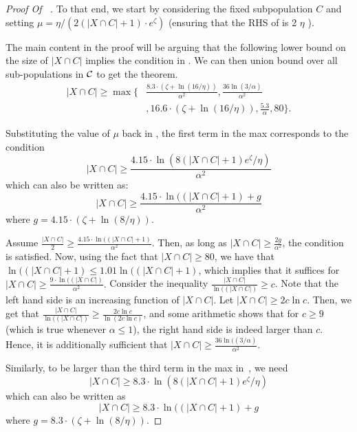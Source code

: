 \begin{proof}[Proof Of ~]
\bigskip\noindent
To that end, we start by considering the fixed subpopulation $C$ and setting $\mu = \eta/\left(2(|X\cap C|+1)\cdot e^{\zeta} \right)$ (ensuring that the RHS of  is 2 $\eta$ ). 

    The main content in the proof will be arguing that the following lower bound on the size of $|X \cap C|$    implies the condition in . We can then union bound over all sub-populations in $\mathcal{C}$ to get the theorem.
    \begin{align}
        |X \cap C| \geq \max\Big\{ & \frac{8.3 \cdot (\zeta + \ln(16/\eta))}{\alpha^2}, \frac{36\ln(3/\alpha)}{\alpha^2} \nonumber \\
        &, 16.6 \cdot (\zeta + \ln(16/\eta)), \frac{5.3}{\alpha}, 80\Big\}.
    \end{align}
 

    
    Substituting the value of $\mu$ back in , the first term in the max corresponds to the condition
    \[
        |X\cap C|\ge \frac{4.15\cdot\ln(8 (|X\cap C|+1) e^{\zeta}/\eta)}{\alpha^2}
    \]
    which can also be written as:
    \[
        |X\cap C|\ge \frac{4.15\cdot\ln((|X\cap C|+1) 
 + g}{\alpha^2}
    \]
   where $g = 4.15 \cdot (\zeta + \ln(8/\eta))$. 

    Assume $ \frac{|X\cap C|}{2} \ge \frac{4.15\cdot\ln((|X\cap C|+1)}{\alpha^2}.$ Then, as long as $|X\cap C| \geq \frac{2g}{\alpha^2}$, the condition is satisfied. Now, using the fact that $|X \cap C| \geq 80$, we have that $\ln((|X\cap C|+1) \leq 1.01\ln((|X\cap C|+1)$, which implies that it suffices for
     $ |X\cap C| \ge \frac{9\cdot\ln((|X\cap C|)}{\alpha^2}.$ Consider the inequality  $ \frac{|X\cap C|}{\ln((|X\cap C|)} \ge  c$. Note that the left hand side is an increasing function of $|X \cap C|$. Let $|X\cap C| \geq 2c \ln c$. Then, we get that  $ \frac{|X\cap C|}{\ln((|X\cap C|)} \ge \frac{2c \ln c}{\ln(2c \ln c)}$, and some arithmetic shows that for $c \geq 9$ (which is true whenever $\alpha \leq 1$), the right hand side is indeed larger than $c$. Hence, it is additionally sufficient that  $ |X\cap C| \ge \frac{36\ln((3/\alpha)}{\alpha^2}.$ 

     Similarly, to be larger than the third term in the max in~, we need 
    \[
        |X\cap C|\ge 8.3 \cdot\ln(8 (|X\cap C|+1) e^{\zeta}/\eta)
    \]
    which can also be written as
    \[
        |X\cap C|\ge 8.3\cdot\ln((|X\cap C|+1) 
 + g
    \]
   where $g = 8.3 \cdot (\zeta + \ln(8/\eta))$. 


\end{proof}
